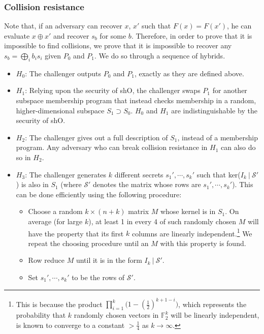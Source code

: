 \documentclass{article}
\begin{document}
\subsubsection{Collision resistance}
Note that, if an adversary can recover $x$, $x'$ such that $F(x) = F(x')$, he can evaluate $x \oplus x'$ and recover $s_b$ for some $b$. Therefore, in order to prove that it is impossible to find collisions, we prove that it is impossible to recover any $s_b = \bigoplus_i b_is_i$ given $P_0$ and $P_1$. We do so through a sequence of hybrids.

\begin{itemize}
    \item $H_0$: The challenger outputs $P_0$ and $P_1$, exactly as they are defined above.
    \item $H_1$: Relying upon the security of \textsf{shO}, the challenger swaps $P_1$ for another subspace membership program that instead checks membership in a random, higher-dimensional subspace $S_1 \supset S_0$. $H_0$ and $H_1$ are indistinguishable by the security of \textsf{shO}.
    \item $H_2$: The challenger gives out a full description of $S_1$, instead of a membership program. Any adversary who can break collision resistance in $H_1$ can also do so in $H_2$.
    \item $H_3$: The challenger generates $k$ different secrets $s_1', \cdots, s_k'$ such that ker($I_k \: | \: \mathcal{S}'$) is also in $S_1$ (where $\mathcal{S}'$ denotes the matrix whose rows are $s_1', \cdots, s_k'$). This can be done efficiently using the following procedure:
    \begin{itemize}
        \item Choose a random $k \times (n+k)$ matrix $M$ whose kernel is in $S_1$. On average (for large $k$), at least 1 in every 4 of such randomly chosen $M$ will have the property that its first $k$ columns are linearly independent.\footnote{This is because the product $\prod_{i=1}^k \big(1-(\frac{1}{2})^{k+1-i}\big)$, which represents the probability that $k$ randomly chosen vectors in $\mathbb{F}_2^k$ will be linearly independent, is known to converge to a constant $ > \frac{1}{4}$ as $k \rightarrow \infty$.} We repeat the choosing procedure until an $M$ with this property is found.
        \item Row reduce $M$ until it is in the form $I_k \: | \: \mathcal{S}'$.
        \item Set $s_1', \cdots, s_k'$ to be the rows of $\mathcal{S}'$.
    \end{itemize}
    

\end{itemize}
\end{document}
